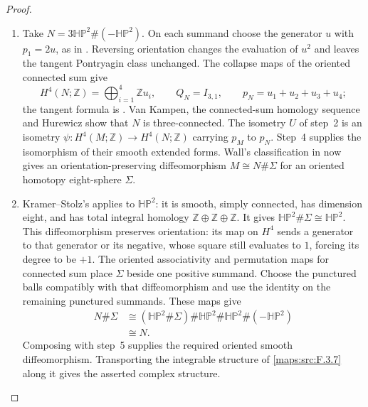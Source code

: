 \begin{proof}
\begin{enumerate}[label=\arabic*.]
\item Take $N=3\mathbb H\mathbb P^2\#(-\mathbb H\mathbb P^2)$.
On each summand choose the generator $u$ with $p_1=2u$, as in
\cite[Lemma~2.1, p.~5]{ffMandal}. Reversing orientation changes
the evaluation of $u^2$ and leaves the tangent Pontryagin class
unchanged. The collapse maps of the oriented connected sum give
\[
H^4(N;\mathbb Z)=\bigoplus_{i=1}^4\mathbb Z u_i,
\qquad Q_N=I_{3,1},\qquad p_N=u_1+u_2+u_3+u_4;
\]
the tangent formula is
\cite[Theorem~2.4, p.~7]{ffMandal}.
Van Kampen, the connected-sum homology sequence and Hurewicz show
that $N$ is three-connected. The isometry $U$ of step~2 is an
isometry $\psi:H^4(M;\mathbb Z)\to H^4(N;\mathbb Z)$ carrying
$p_M$ to $p_N$. Step~4 supplies the isomorphism of their smooth
extended forms. Wall's classification in
\cite[Theorem~3.7(1), pp.~13--14]{IVVWallForm} now gives an
orientation-preserving diffeomorphism
$M\cong N\#\Sigma$ for an oriented homotopy eight-sphere $\Sigma$.

\item Kramer--Stolz's
\cite[Theorem~A, p.~178]{IVVKramerStolz} applies to
$\mathbb H\mathbb P^2$: it is smooth, simply connected, has dimension
eight, and has total integral homology $\mathbb Z\oplus\mathbb Z
\oplus\mathbb Z$. It gives
$\mathbb H\mathbb P^2\#\Sigma\cong\mathbb H\mathbb P^2$.
This diffeomorphism preserves orientation: its map on $H^4$ sends
a generator to that generator or its negative, whose square still
evaluates to $1$, forcing its degree to be $+1$.
The oriented associativity and permutation maps for connected sum
place $\Sigma$ beside one positive summand. Choose the punctured
balls compatibly with that diffeomorphism and use the identity on
the remaining punctured summands. These maps give
\[
\begin{aligned}
N\#\Sigma
&\cong(\mathbb H\mathbb P^2\#\Sigma)\#\mathbb H\mathbb P^2
       \#\mathbb H\mathbb P^2\#(-\mathbb H\mathbb P^2)\\
&\cong N.
\end{aligned}
\]
Composing with step~5 supplies the required oriented smooth
diffeomorphism. Transporting the integrable structure of
\cref{maps:src:F.3.7} along it gives the asserted complex structure.
\end{enumerate}
\end{proof}

